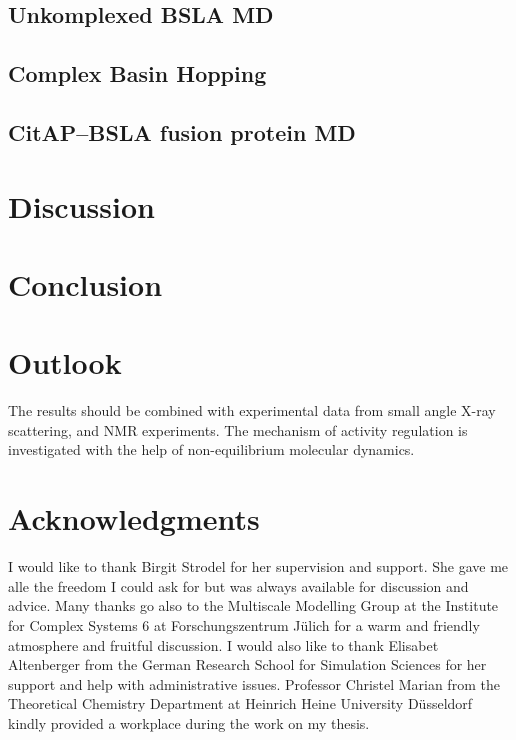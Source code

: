 \documentclass[english, a4paper, 12pt, titlepage, draft]{article}
\begin{document}
\subsection{Unkomplexed BSLA MD}
\subsection{Complex Basin Hopping}
\subsection{CitAP--BSLA fusion protein MD}



\section{Discussion}


\section{Conclusion}


\section{Outlook}
The results should be combined with experimental data from small angle X-ray scattering, and NMR experiments. The mechanism of activity regulation is investigated with the help of non-equilibrium molecular dynamics.



\pagebreak

\section{Acknowledgments}

I would like to thank Birgit Strodel for her supervision and support.
She gave me alle the freedom I could ask for but was always available for discussion and advice.
Many thanks go also to the Multiscale Modelling Group at the Institute for Complex Systems 6 at Forschungszentrum J\"ulich for a warm and friendly atmosphere and fruitful discussion.
I would also like to thank Elisabet Altenberger from the German Research School for Simulation Sciences for her support and help with administrative issues.
Professor Christel Marian from the Theoretical Chemistry Department at Heinrich Heine University D\"usseldorf kindly provided a workplace during the work on my thesis.
\end{document}
